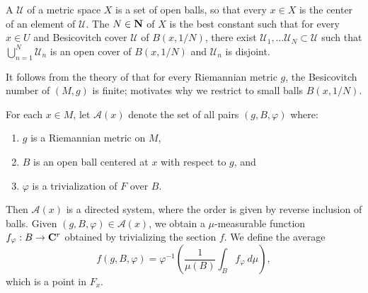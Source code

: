 \begin{definition}
A  $\mathcal U$ of a metric space $X$ is a set of open balls, so that every $x \in X$ is the center of an element of $\mathcal U$.
The  $N \in \mathbf{N}$ of $X$ is the best constant such that for every $x \in U$ and Besicovitch cover $\mathcal U$ of $B(x, 1/N)$, there exist $\mathcal U_1, \dots \mathcal U_N \subset \mathcal U$ such that $\bigcup_{n=1}^N \mathcal U_n$ is an open cover of $B(x, 1/N)$ and $\mathcal U_n$ is disjoint.
\end{definition}

It follows from the theory of \cite[\S2.8]{federer2014geometric} that for every Riemannian metric $g$, the Besicovitch number of $(M, g)$ is finite; \cite{Shi91} motivates why we restrict to small balls $B(x, 1/N)$.

For each $x \in M$, let $\mathcal A(x)$ denote the set of all pairs $(g, B, \varphi)$ where:
\begin{enumerate}
\item $g$ is a Riemannian metric on $M$,
\item $B$ is an open ball centered at $x$ with respect to $g$, and
\item $\varphi$ is a trivialization of $F$ over $B$.
\end{enumerate}
Then $\mathcal A(x)$ is a directed system, where the order is given by reverse inclusion of balls.
Given $(g, B, \varphi) \in \mathcal A(x)$, we obtain a $\mu$-measurable function $f_\varphi: B \to \mathbf{C}^r$ obtained by trivializing the section $f$.
We define the average
\begin{equation}\label{average in a vector bundle}
f(g, B, \varphi) = \varphi^{-1}\left(\frac{1}{\mu(B)} \int_B f_\varphi ~d\mu\right),
\end{equation}
which is a point in $F_x$.

